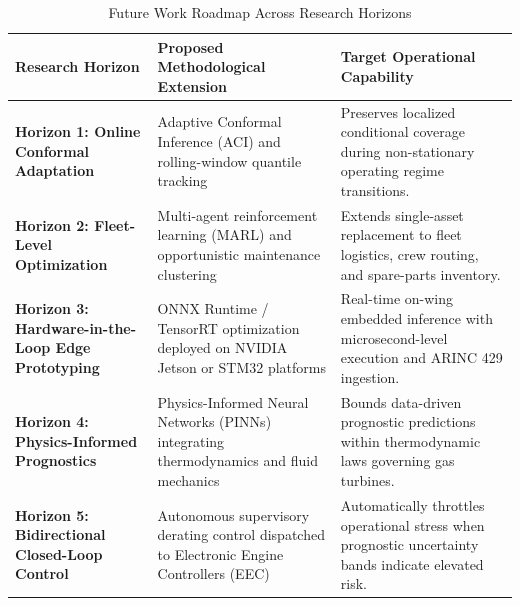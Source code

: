 \documentclass[12pt,a4paper]{article}
\begin{document}
\begin{table}[htbp]
\centering
\small
{}
\caption{Future Work Roadmap Across Research Horizons}
\label{tab:future_work}
\vspace{4pt}
\begin{tabularx}{\textwidth}{p{2.8cm} p{5.4cm} p{6.2cm}}
\toprule
\textbf{Research Horizon} & \textbf{Proposed Methodological Extension} & \textbf{Target Operational Capability} \\
\midrule
\textbf{Horizon 1: Online Conformal Adaptation} & Adaptive Conformal Inference (ACI) and rolling-window quantile tracking & Preserves localized conditional coverage during non-stationary operating regime transitions. \\
\textbf{Horizon 2: Fleet-Level Optimization} & Multi-agent reinforcement learning (MARL) and opportunistic maintenance clustering & Extends single-asset replacement to fleet logistics, crew routing, and spare-parts inventory. \\
\textbf{Horizon 3: Hardware-in-the-Loop Edge Prototyping} & ONNX Runtime / TensorRT optimization deployed on NVIDIA Jetson or STM32 platforms & Real-time on-wing embedded inference with microsecond-level execution and ARINC 429 ingestion. \\
\textbf{Horizon 4: Physics-Informed Prognostics} & Physics-Informed Neural Networks (PINNs) integrating thermodynamics and fluid mechanics & Bounds data-driven prognostic predictions within thermodynamic laws governing gas turbines. \\
\textbf{Horizon 5: Bidirectional Closed-Loop Control} & Autonomous supervisory derating control dispatched to Electronic Engine Controllers (EEC) & Automatically throttles operational stress when prognostic uncertainty bands indicate elevated risk. \\
\bottomrule
\end{tabularx}
\end{table}
\end{document}
